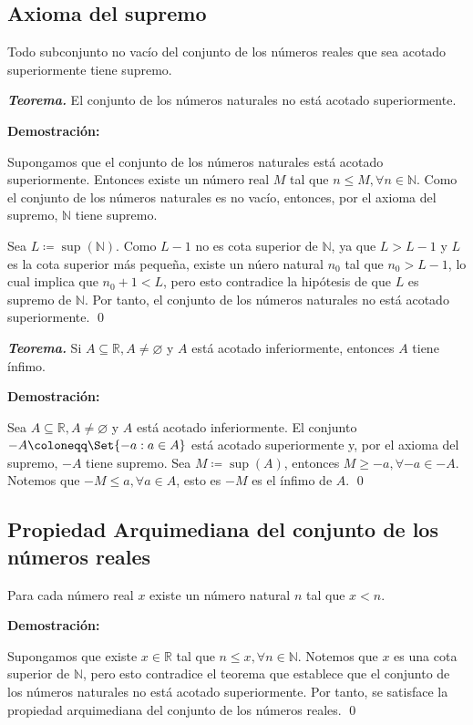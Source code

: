 \documentclass[11pt]{article}
\newcommand{\N}{\mathbb{N}}
\newcommand{\R}{\mathbb{R}}
\let\emptyset\varnothing
\let\set\Set
\begin{document}
\subsection*{Axioma del supremo}

Todo subconjunto no vacío del conjunto de los números reales que sea acotado superiormente tiene supremo.

\textbf{\textit{Teorema.}} El conjunto de los números naturales no está acotado superiormente.

\textbf{Demostración:}

Supongamos que el conjunto de los números naturales está acotado superiormente. Entonces existe un número real $M$ tal que $n\leq M, \forall n\in \N$. Como el conjunto de los números naturales es no vacío, entonces, por el axioma del supremo, $\N$ tiene supremo.

Sea $L\coloneqq \sup{(\N)}$. Como $L-1$ no es cota superior de $\N$, ya que $L>L-1$ y $L$ es la cota superior más pequeña, existe un núero natural $n_0$ tal que $n_0>L-1$, lo cual implica que $n_0+1<L$, pero esto contradice la hipótesis	de que $L$ es supremo de $\N$. Por tanto, el conjunto de los números naturales no está acotado superiormente. \qed

\textbf{\textit{Teorema.}} Si $A\subseteq \R, A\neq \emptyset$ y $A$ está acotado inferiormente, entonces $A$ tiene ínfimo.

\textbf{Demostración:}

Sea $A\subseteq \R, A\neq \emptyset$ y $A$ está acotado inferiormente. El conjunto $-A \coloneqq \set{-a: a\in A}$ está acotado superiormente y, por el axioma del supremo, $-A$ tiene supremo. Sea $M\coloneqq \sup{(A)}$, entonces $M\geq -a, \forall -a\in -A$. Notemos que $-M\leq a, \forall a\in A$, esto es $-M$ es el ínfimo de $A$. \qed

\subsection*{Propiedad Arquimediana del conjunto de los números reales}

Para cada número real $x$ existe un número natural $n$ tal que $x<n$.

\textbf{Demostración:}

Supongamos que existe $x\in \R$ tal que $n\leq x, \forall n\in \N$. Notemos que $x$ es una cota superior de $\N$, pero esto contradice el teorema que establece que el conjunto de los números naturales no está acotado superiormente. Por tanto, se satisface la propiedad arquimediana del conjunto de los números reales. \qed
\end{document}
